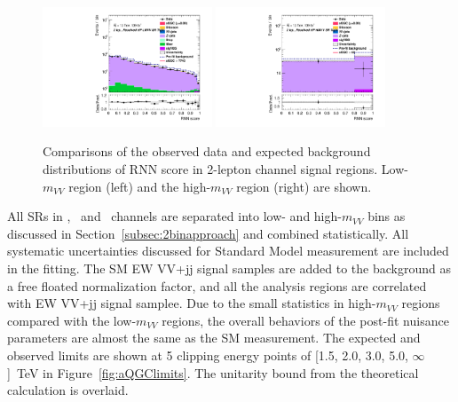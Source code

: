 \begin{figure}[]
    \includegraphics[width=0.45\textwidth]{figures/aQGC/PostFit/Region_distRNNScoreResolved_DSRVBSFidLMlljj1500_BMin0_T0_Y6051_incTag1_J2_L2_incJet1_GlobalFit_unconditionnal_mu1log}
    \includegraphics[width=0.45\textwidth]{figures/aQGC/PostFit/Region_distRNNScoreResolved_DSRVBSFidHMlljj1500_BMin0_T0_Y6051_incTag1_J2_L2_incJet1_GlobalFit_unconditionnal_mu1log}
    \caption{Comparisons of the observed data and expected background distributions of RNN score in 2-lepton channel signal regions. Low-$m_{VV}$ region (left) and the high-$m_{VV}$ region (right) are shown. }
    \label{fig:postSR2lepaQGC}
\end{figure}

All SRs in \zlep, \olep\, and \tlep\ channels are separated into low- and high-$m_{VV}$ bins as discussed in Section~\ref{subsec:2binapproach} and combined statistically.
All systematic uncertainties discussed for Standard Model measurement are included in the fitting.
The SM EW VV+jj signal samples are added to the background as a free floated normalization factor, and all the analysis regions are correlated with EW VV+jj signal samplee.
Due to the small statistics in high-$m_{VV}$ regions compared with the low-$m_{VV}$ regions, the overall behaviors of the post-fit nuisance parameters are almost the same as the SM measurement.
The expected and observed limits are shown at 5 clipping energy points of [1.5, 2.0, 3.0, 5.0, $\infty$]~TeV in Figure~\ref{fig:aQGClimits}.
The unitarity bound from the theoretical calculation \cite{PhysRevD.101.113003} is overlaid.

